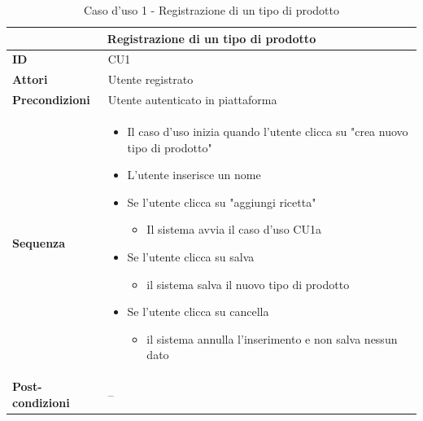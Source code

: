 \documentclass[a4paper,11pt]{article}
\begin{document}
\begin{table}[H]
  \centering
  \begin{tabular}{|m{2cm}|m{10.5cm}|}
    \hline
    \multicolumn{2}{|c|}{\textbf{Registrazione di un tipo di prodotto}}                \\ \hline
    \multicolumn{1}{|l|}{\textbf{ID}}              & CU1                               \\ \hline
    \multicolumn{1}{|l|}{\textbf{Attori}}          & Utente registrato                 \\ \hline
    \multicolumn{1}{|l|}{\textbf{Precondizioni}}   & Utente autenticato in piattaforma \\ \hline
    \multicolumn{1}{|l|}{\textbf{Sequenza}}        &
    \begin{itemize}
      \item Il caso d'uso inizia quando l'utente clicca su "crea nuovo tipo di prodotto"
      \item L'utente inserisce un nome
      \item Se l'utente clicca su "aggiungi ricetta"
            \begin{itemize}
              \item Il sistema avvia il caso d'uso CU1a
            \end{itemize}
      \item Se l'utente clicca su salva
            \begin{itemize}
              \item il sistema salva il nuovo tipo di prodotto
            \end{itemize}
      \item Se l'utente clicca su cancella
            \begin{itemize}
              \item il sistema annulla l'inserimento e non salva nessun dato
            \end{itemize}
    \end{itemize}  \\ \hline
    \multicolumn{1}{|l|}{\textbf{Post-condizioni}} & --                                \\ \hline
  \end{tabular}
  \caption{Caso d'uso 1 - Registrazione di un tipo di prodotto}
  \label{cu:CU1}
\end{table}
\end{document}
